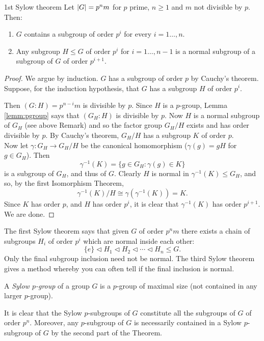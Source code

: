 \begin{thm}{1st Sylow theorem}{}
Let $\left| G\right|=p^nm$ for $p$ prime, $n\ge 1$ and $m$ not divisible by $p$. Then:
\begin{enumerate}
\item $G$ contains a subgroup of order $p^i$ for every $i=1\ldots,n$.
\item Any subgroup $H\le G$ of order $p^i$ for $i=1\ldots,n-1$ is a normal subgroup of a subgroup of $G$ of order $p^{i+1}$.
\end{enumerate}
\end{thm}

\begin{proof}
We argue by induction. $G$ has a subgroup of order $p$ by Cauchy's theorem. Suppose, for the induction hypothesis, that $G$ has a subgroup $H$ of order $p^i$.

Then $(G:H)=p^{n-i}m$ is divisible by $p$. Since $H$ is a $p$-group, Lemma \ref{lemm:pgroup} says that $(G_H:H)$ is divisible by $p$. Now $H$ is a normal subgroup of $G_H$ (see above Remark) and so the factor group $G_H/H$ exists and has order divisible by $p$. By Cauchy's theorem, $G_H/H$ has a subgroup $K$ of order $p$.\\
Now let $\gamma:G_H\to G_H/H$ be the canonical homomorphism ($\gamma(g)=gH$ for $g\in G_H$). Then
\[\gamma^{-1}(K)=\{g\in G_H:\gamma(g)\in K\}\]
is a subgroup of $G_H$, and thus of $G$. Clearly $H$ is normal in $\gamma^{-1}(K)\le G_H$, and so, by the first Isomorphism Theorem,
\[\gamma^{-1}(K)/H\cong\gamma(\gamma^{-1}(K))=K.\]
Since $K$ has order $p$, and $H$ has order $p^i$, it is clear that $\gamma^{-1}(K)$ has order $p^{i+1}$. We are done.
\end{proof}

The first Sylow theorem says that given $G$ of order $p^nm$ there exists a chain of subgroups $H_i$ of order $p^i$ which are normal inside each other:
\[\{e\}\triangleleft H_1\triangleleft H_2\triangleleft\cdots\triangleleft H_n\le G.\]
Only the final subgroup inclusion need not be normal. The third Sylow theorem gives a method whereby you can often tell if the final inclusion is normal.

\begin{defn}{}{}
A \emph{Sylow $p$-group} of a group $G$ is a $p$-group of maximal size (not contained in any larger $p$-group).
\end{defn}

It is clear that the Sylow $p$-subgroups of $G$ constitute all the subgroups of $G$ of order $p^n$. Moreover, any $p$-subgroup of $G$ is necessarily contained in a Sylow $p$-subgroup of $G$ by the second part of the Theorem.

